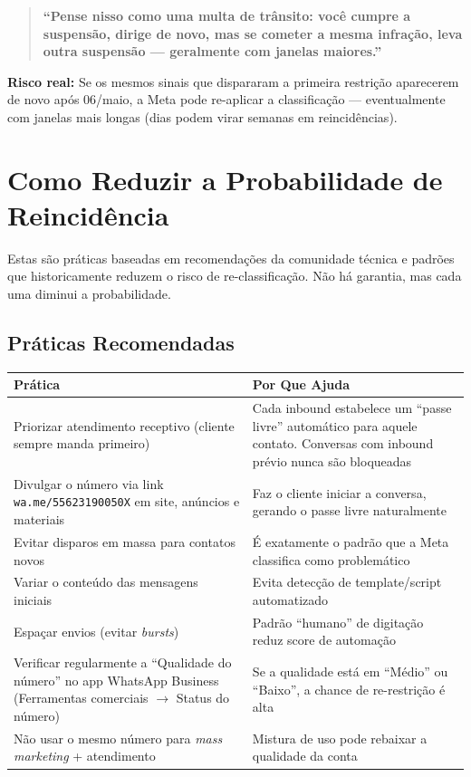 \documentclass[12pt, a4paper]{article}
\begin{document}
\begin{quote}
\textcolor{primaryColor}{\textbf{``Pense nisso como uma multa de trânsito: você cumpre a suspensão, dirige de novo, mas se cometer a mesma infração, leva outra suspensão --- geralmente com janelas maiores.''}}
\end{quote}

\textcolor{warningOrange}{\textbf{Risco real:}} Se os mesmos sinais que dispararam a primeira restrição aparecerem de novo após 06/maio, a Meta pode re-aplicar a classificação --- eventualmente com janelas mais longas (dias podem virar semanas em reincidências).

\needspace{10cm}

\section{Como Reduzir a Probabilidade de Reincidência}

Estas são práticas baseadas em recomendações da comunidade técnica e padrões que historicamente reduzem o risco de re-classificação. Não há garantia, mas cada uma diminui a probabilidade.

\subsection{Práticas Recomendadas}

\begin{table}[H]
    \centering
    \renewcommand{\arraystretch}{1.5}
    \begin{tabularx}{\textwidth}{X X}
        \toprule
        \rowcolor{tableHeader} \textbf{Prática} & \textbf{Por Que Ajuda} \\
        \midrule
        Priorizar atendimento receptivo (cliente sempre manda primeiro) & Cada inbound estabelece um ``passe livre'' automático para aquele contato. Conversas com inbound prévio nunca são bloqueadas \\
        \rowcolor{lightGray}
        Divulgar o número via link \texttt{wa.me/55623190050X} em site, anúncios e materiais & Faz o cliente iniciar a conversa, gerando o passe livre naturalmente \\
        Evitar disparos em massa para contatos novos & É exatamente o padrão que a Meta classifica como problemático \\
        \rowcolor{lightGray}
        Variar o conteúdo das mensagens iniciais & Evita detecção de template/script automatizado \\
        Espaçar envios (evitar \textit{bursts}) & Padrão ``humano'' de digitação reduz score de automação \\
        \rowcolor{lightGray}
        Verificar regularmente a ``Qualidade do número'' no app WhatsApp Business (Ferramentas comerciais $\rightarrow$ Status do número) & Se a qualidade está em ``Médio'' ou ``Baixo'', a chance de re-restrição é alta \\
        Não usar o mesmo número para \textit{mass marketing} + atendimento & Mistura de uso pode rebaixar a qualidade da conta \\
        \bottomrule
    \end{tabularx}
\end{table}
\end{document}
